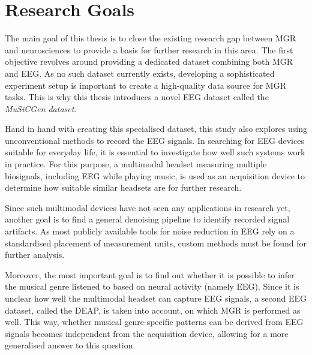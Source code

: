   \section{Research Goals}
    The main goal of this thesis is to close the existing research gap between \ac{MGR} and neurosciences to provide a basis for further research in this area. The first objective revolves around providing a dedicated dataset combining both \ac{MGR} and \ac{EEG}. As no such dataset currently exists, developing a sophisticated experiment setup is important to create a high-quality data source for \ac{MGR} tasks. This is why this thesis introduces a novel \ac{EEG} dataset called the \textit{\ac{MuSiCGen} dataset}. \par
    Hand in hand with creating this specialised dataset, this study also explores using unconventional methods to record the \ac{EEG} signals. In searching for \ac{EEG} devices suitable for everyday life, it is essential to investigate how well such systems work in practice. For this purpose, a multimodal headset measuring multiple biosignals, including \ac{EEG} while playing music, is used as an acquisition device to determine how suitable similar headsets are for further research. \par
    Since such multimodal devices have not seen any applications in research yet, another goal is to find a general denoising pipeline to identify recorded signal artifacts. As most publicly available tools for noise reduction in \ac{EEG} rely on a standardised placement of measurement units, custom methods must be found for further analysis. \par
    Moreover, the most important goal is to find out whether it is possible to infer the musical genre listened to based on neural activity (namely \ac{EEG}). Since it is unclear how well the multimodal headset can capture \ac{EEG} signals, a second \ac{EEG} dataset, called the \ac{DEAP}, is taken into account, on which \ac{MGR} is performed as well. This way, whether musical genre-specific patterns can be derived from \ac{EEG} signals becomes independent from the acquisition device, allowing for a more generalised answer to this question.


